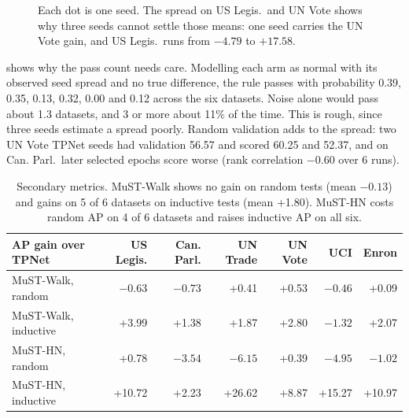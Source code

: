 \documentclass[11pt,a4paper]{article}
\theoremstyle{plain}
\theoremstyle{definition}
\begin{document}
\begin{figure}[H]\centering
{}
\caption{Each dot is one seed. The spread on US Legis.\ and UN Vote shows why three seeds cannot settle those means: one seed carries the UN Vote gain, and US Legis.\ runs from $-4.79$ to $+17.58$.}\label{fig:seeds}
\end{figure}

 shows why the pass count needs care. Modelling each arm as normal with its observed seed spread and no true difference, the rule passes with probability 0.39, 0.35, 0.13, 0.32, 0.00 and 0.12 across the six datasets. Noise alone would pass about 1.3 datasets, and 3 or more about 11\% of the time. This is rough, since three seeds estimate a spread poorly. Random validation adds to the spread: two UN Vote TPNet seeds had validation 56.57 and scored 60.25 and 52.37, and on Can. Parl.\ later selected epochs score worse (rank correlation $-0.60$ over 6 runs).

\begin{table}[H]\centering\small
\begin{tabular}{lrrrrrr}
\toprule
AP gain over TPNet & US Legis. & Can. Parl. & UN Trade & UN Vote & UCI & Enron\\
\midrule
MuST-Walk, random & $-0.63$ & $-0.73$ & +0.41 & +0.53 & $-0.46$ & +0.09\\
MuST-Walk, inductive & +3.99 & +1.38 & +1.87 & +2.80 & $-1.32$ & +2.07\\
MuST-HN, random & +0.78 & $-3.54$ & $-6.15$ & +0.39 & $-4.95$ & $-1.02$\\
MuST-HN, inductive & +10.72 & +2.23 & +26.62 & +8.87 & +15.27 & +10.97\\
\bottomrule
\end{tabular}
\caption{Secondary metrics. MuST-Walk shows no gain on random tests (mean $-0.13$) and gains on 5 of 6 datasets on inductive tests (mean +1.80). MuST-HN costs random AP on 4 of 6 datasets and raises inductive AP on all six.}\label{tab:secondary}
\end{table}
\end{document}
